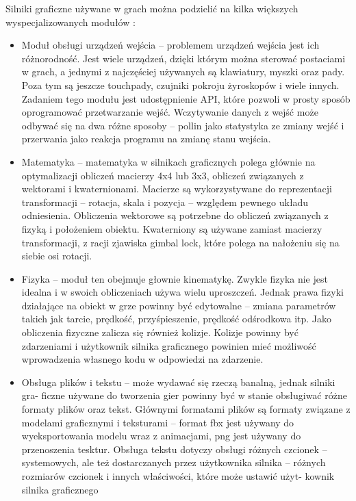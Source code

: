 \documentclass[12pt,twoside]{article}
\begin{document}
Silniki graficzne używane w grach można podzielić na kilka większych
wyspecjalizowanych modułów \cite{GameEngineArchitecture}:
\begin{itemize}
\item Moduł obsługi urządzeń wejścia -- problemem urządzeń wejścia jest
ich różnorodność. Jest wiele urządzeń, dzięki którym można sterować postaciami w
grach, a jednymi z najczęściej używanych są klawiatury, myszki oraz pady. Poza
tym są jeszcze touchpady, czujniki pokroju żyroskopów i wiele innych. Zadaniem
tego modułu jest udostępnienie API, które pozwoli w prosty sposób oprogramować
przetwarzanie wejść. Wczytywanie danych z wejść może odbywać się na dwa różne
sposoby -- pollin jako statystyka ze zmiany wejść i przerwania jako
reakcja programu na zmianę stanu wejścia.

\item Matematyka -- matematyka w silnikach graficznych polega głównie
na optymalizacji obliczeń macierzy 4x4 lub 3x3, obliczeń związanych z wektorami
i kwaternionami. Macierze są wykorzystywane do reprezentacji transformacji
-- rotacja, skala i pozycja -- względem pewnego układu
odniesienia. Obliczenia wektorowe są potrzebne do obliczeń związanych z fizyką i
położeniem obiektu. Kwaterniony są używane zamiast macierzy transformacji, z
racji zjawiska gimbal lock, które polega na nałożeniu się na siebie osi rotacji.  

\item Fizyka -- moduł ten obejmuje głownie kinematykę. Zwykle fizyka
nie jest idealna i w swoich obliczeniach używa wielu uproszczeń. Jednak prawa
fizyki działające na obiekt w grze powinny być edytowalne -- zmiana
parametrów takich jak tarcie, prędkość, przyśpieszenie, prędkość odśrodkowa itp.
Jako obliczenia fizyczne zalicza się również kolizje. Kolizje powinny być
zdarzeniami i użytkownik silnika graficznego powinien mieć możliwość
wprowadzenia własnego kodu w odpowiedzi na zdarzenie. \cite{GameDevelpomenPhysics} 

\item Obsługa plików i tekstu – może wydawać się rzeczą banalną, jednak silniki
gra- ficzne używane do tworzenia gier powinny być w stanie obsługiwać różne
formaty plików oraz tekst. Głównymi formatami plików są formaty związane z
modelami graficznymi i teksturami – format fbx jest używany do wyeksportowania
modelu wraz z animacjami, png jest używany do przenoszenia tesktur. Obsługa
tekstu dotyczy obsługi różnych czcionek – systemowych, ale też dostarczanych
przez użytkownika silnika – różnych rozmiarów czcionek i innych właściwości,
które może ustawić użyt- kownik silnika graficznego
 


\end{itemize}
\end{document}
